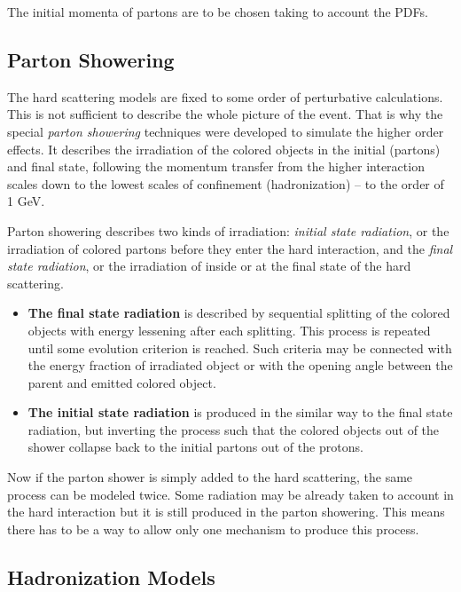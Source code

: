 The initial momenta of partons are to be chosen taking to account the PDFs.

\subsection{Parton Showering}

The hard scattering models are fixed to some order of perturbative calculations. This is not sufficient to describe the 
whole picture of the event. That is why the special \textit{parton showering} techniques were developed to simulate the 
higher order effects. It describes the irradiation of the colored objects in the initial (partons) and final state,
following the momentum transfer from the higher interaction scales down to the lowest scales of confinement (hadronization) --
to the order of 1 GeV.

Parton showering describes two kinds of irradiation: \textit{initial state radiation}, or the irradiation of colored partons
before they enter the hard interaction, and the \textit{final state radiation}, or the irradiation of inside or at the final
state of the hard scattering.

\begin{itemize}
 \item \textbf{The final state radiation} is described by sequential splitting of the colored objects with energy lessening
 after each splitting. This process is repeated until some evolution criterion is reached. Such criteria may be connected
 with the energy fraction of irradiated object or with the opening angle between the parent and emitted colored object.
 
 \item \textbf{The initial state radiation} is produced in the similar way to the final state radiation, but inverting
 the process such that the colored objects out of the shower collapse back to the initial partons out of the protons.
\end{itemize}

Now if the parton shower is simply added to the hard scattering, the same process can be modeled twice. Some radiation
may be already taken to account in the hard interaction but it is still produced in the parton showering. This means 
there has to be a way to allow only one mechanism to produce this process.

\subsection{Hadronization Models}

